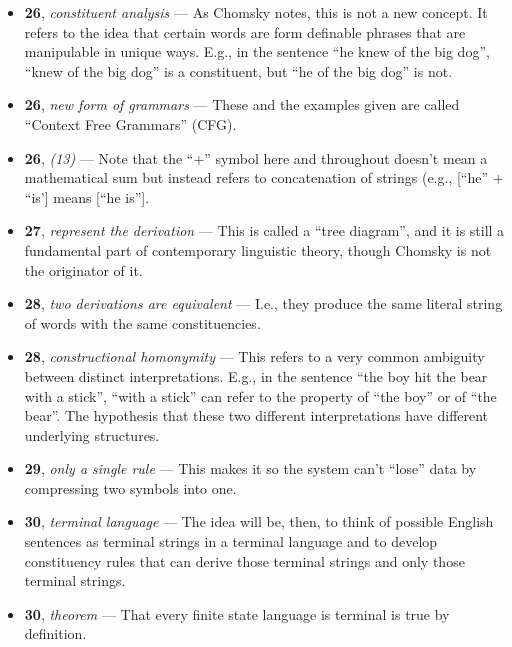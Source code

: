 \documentclass[12pt]{article}
\begin{document}
\begin{itemize}

\item \textbf{26}, \textit{constituent analysis} --- As Chomsky notes, this is not a new concept. It refers to the idea that certain words are form definable phrases that are manipulable in unique ways. E.g., in the sentence ``he knew of the big dog'', ``knew of the big dog'' is a constituent, but ``he of the big dog'' is not.

\item \textbf{26}, \textit{new form of grammars} --- These and the examples given are called ``Context Free Grammars'' (CFG).

\item \textbf{26}, \textit{(13)} --- Note that the ``+'' symbol here and throughout doesn't mean a mathematical sum but instead refers to concatenation of strings (e.g., [``he'' + ``is'] means [``he is''].

\item \textbf{27}, \textit{represent the derivation} --- This is called a ``tree diagram'', and it is still a fundamental part of contemporary linguistic theory, though Chomsky is not the originator of it.

\item \textbf{28}, \textit{two derivations are equivalent} --- I.e., they produce the same literal string of words with the same constituencies.

\item \textbf{28}, \textit{constructional homonymity} --- This refers to a very common ambiguity between distinct interpretations. E.g., in the sentence ``the boy hit the bear with a stick'', ``with a stick'' can refer to the property of ``the boy'' or of ``the bear''. The hypothesis that these two different interpretations have different underlying structures.

\item \textbf{29}, \textit{only a single rule} --- This makes it so the system can't ``lose'' data by compressing two symbols into one.

\item \textbf{30}, \textit{terminal language} --- The idea will be, then, to think of possible English sentences as terminal strings in a terminal language and to develop constituency rules that can derive those terminal strings and only those terminal strings.

\item \textbf{30}, \textit{theorem} --- That every finite state language is terminal is true by definition.


\end{itemize}
\end{document}
